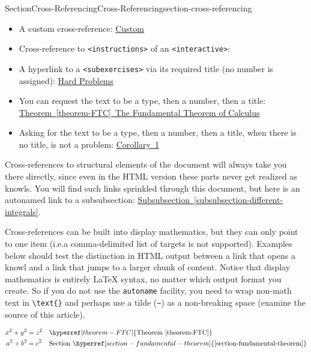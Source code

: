 \documentclass[twoside,10pt,]{article}
\newcommand{\xreffont}{\relax}
\newcommand{\mono}[1]{\texttt{#1}}
\numberwithin{equation}{section}
\begin{document}
\begin{sectionptx}{Section}{Cross-Referencing}{}{Cross-Referencing}{}{}{section-cross-referencing}
\begin{itemize}[label=\textbullet]
\item{}A custom cross-reference: \hyperref[corollary-FTC-derivative]{Custom}%
\item{}Cross-reference to \mono{<instructions>} of an \mono{<interactive>}: \hyperlink{}{}%
\item{}A hyperlink to a \mono{<subexercises>} via its required title (no number is assigned): \hyperlink{hard-subexercises}{Hard Problems}%
\item{}You can request the text to be a type, then a number, then a title: \hyperref[theorem-FTC]{Theorem~{\xreffont\ref{theorem-FTC}}~The Fundamental Theorem of Calculus}%
\item{}Asking for the text to be a type, then a number, then a title, when there is no title, is not a problem: \hyperref[corollary-FTC-derivative]{Corollary~1}%
\end{itemize}
%
\par
Cross-references to structural elements of the document will always take you there directly, since even in the HTML version these parts never get realized as knowls.  You will find such links sprinkled through this document, but here is an autonamed link to a subsubsection:  \hyperref[subsubsection-different-integrals]{Subsubsection~{\xreffont\ref{subsubsection-different-integrals}}}.%
\par
Cross-references can be built into display mathematics, but they can only point to one item (i.e.\@ a comma-delimited list of targets is not supported).  Examples below should test the distinction in HTML output between a link that opens a knowl and a link that jumps to a larger chunk of content.  Notice that display mathematics is entirely \LaTeX{} syntax, no matter which output format you create.  So if you do not use the \mono{autoname} facility, you need to wrap non-math text in \mono{\textbackslash{}text\{\}} and perhaps use a tilde (\mono{\textasciitilde{}}) as a non-breaking space (examine the source of this article).%
\par
%
\begin{align*}
x^2 + y^2 &= z^2&&\hyperref[theorem-FTC]{\text{Theorem {\xreffont\ref{theorem-FTC}}}}\\
a^2 + b^2 &= c^2&&\text{Section}~\hyperref[section-fundamental-theorem]{\text{{\xreffont\ref{section-fundamental-theorem}}}}
\end{align*}
%
\par

\end{sectionptx}
\end{document}
